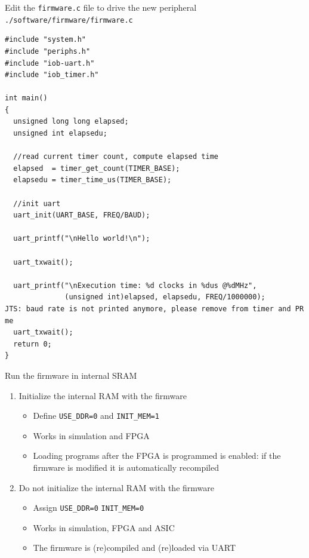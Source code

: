 \documentclass [xcolor=svgnames, t] {beamer}
\begin{document}

\begin{frame}[fragile]{Edit the {\tt firmware.c} file to drive the new peripheral}
  {\tt ./software/firmware/firmware.c}
  \begin{tiny}
    \begin{lstlisting}
#include "system.h"
#include "periphs.h"
#include "iob-uart.h"
#include "iob_timer.h"

int main()
{
  unsigned long long elapsed;
  unsigned int elapsedu;

  //read current timer count, compute elapsed time
  elapsed  = timer_get_count(TIMER_BASE);
  elapsedu = timer_time_us(TIMER_BASE);

  //init uart 
  uart_init(UART_BASE, FREQ/BAUD);

  uart_printf("\nHello world!\n");
  
  uart_txwait();

  uart_printf("\nExecution time: %d clocks in %dus @%dMHz", 
              (unsigned int)elapsed, elapsedu, FREQ/1000000);
JTS: baud rate is not printed anymore, please remove from timer and PR me
  uart_txwait();
  return 0;
}
\end{lstlisting}
\end{tiny}
\end{frame}


\begin{frame}{Run the firmware in internal SRAM}
\begin{enumerate}
\item Initialize the internal RAM with the firmware
  \begin{itemize}
  \item Define {\tt USE\_DDR=0} and {\tt INIT\_MEM=1}
  \item Works in simulation and FPGA
  \item Loading programs after the FPGA is programmed is enabled: if the firmware is modified it is automatically recompiled
  \end{itemize}
\item Do not initialize the internal RAM with the firmware
  \begin{itemize}
  \item Assign {\tt USE\_DDR=0} {\tt INIT\_MEM=0}
  \item Works in simulation, FPGA and ASIC
  \item The firmware is (re)compiled and (re)loaded via UART
  \end{itemize}
\end{enumerate}
\end{frame}
\end{document}
